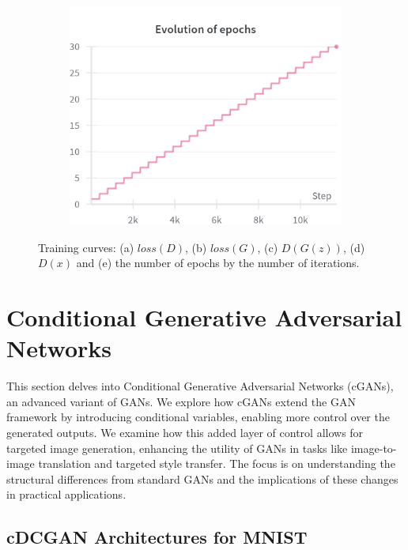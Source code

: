 \begin{figure}[H]
    \begin{subfigure}{0.45\textwidth}
        \centering
        \includegraphics[width=0.95\linewidth]{cifar10/64/epochs.png}
        \caption{}
        \label{subfig:cifar10/64/epochs}
    \end{subfigure}%

    \caption{Training curves: (a) $loss(D)$, (b) $loss(G)$, (c) $D(G(z))$, (d) $D(x)$ and (e) the number of epochs by the number of iterations.}
    \label{fig:cifar10_64_curves}
\end{figure}

\section{Conditional Generative Adversarial Networks}

This section delves into Conditional Generative Adversarial Networks (cGANs), an advanced variant of GANs. We explore how cGANs extend the GAN framework by introducing conditional variables, enabling more control over the generated outputs. We examine how this added layer of control allows for targeted image generation, enhancing the utility of GANs in tasks like image-to-image translation and targeted style transfer. The focus is on understanding the structural differences from standard GANs and the implications of these changes in practical applications.

\subsection{cDCGAN Architectures for MNIST}

